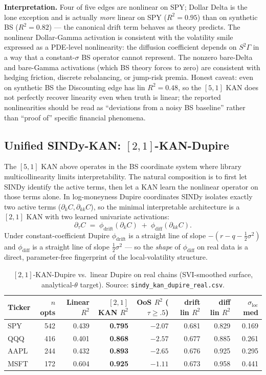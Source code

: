 \documentclass[10pt]{article}
\begin{document}
\textbf{Interpretation.} Four of five edges are nonlinear on SPY; Dollar Delta is the lone exception and is actually \emph{more} linear on SPY ($R^2{=}0.95$) than on synthetic BS ($R^2{=}0.82$) --- the canonical drift term behaves as theory predicts. The nonlinear Dollar-Gamma activation is consistent with the volatility smile expressed as a PDE-level nonlinearity: the diffusion coefficient depends on $S^2\Gamma$ in a way that a constant-$\sigma$ BS operator cannot represent. The nonzero bare-Delta and bare-Gamma activations (which BS theory forces to zero) are consistent with hedging friction, discrete rebalancing, or jump-risk premia. Honest caveat: even on synthetic BS the Discounting edge has lin $R^2{=}0.48$, so the $[5,1]$ KAN does not perfectly recover linearity even when truth is linear; the reported nonlinearities should be read as ``deviations from a noisy BS baseline'' rather than ``proof of'' specific financial phenomena.

\subsection{Unified SINDy-KAN: $[2,1]$-KAN-Dupire}\label{sec:sindy-kan}

The $[5,1]$ KAN above operates in the BS coordinate system where library multicollinearity limits interpretability. The natural composition is to first let SINDy identify the active terms, then let a KAN learn the nonlinear operator on those terms alone. In log-moneyness Dupire coordinates SINDy isolates exactly two active terms ($\partial_k C, \partial_{kk}C$), so the minimal interpretable architecture is a $[2,1]$ KAN with two learned univariate activations:
\[
\partial_\tau C \;=\; \phi_{\text{drift}}(\partial_k C) \;+\; \phi_{\text{diff}}(\partial_{kk}C).
\]
Under constant-coefficient Dupire $\phi_{\text{drift}}$ is a straight line of slope $-(r{-}q{-}\tfrac12\sigma^2)$ and $\phi_{\text{diff}}$ is a straight line of slope $\tfrac12\sigma^2$ --- so the \emph{shape} of $\phi_{\text{diff}}$ on real data is a direct, parameter-free fingerprint of the local-volatility structure.

\begin{table}[h]
\centering\footnotesize
\caption{$[2,1]$-KAN-Dupire vs.\ linear Dupire on real chains (SVI-smoothed surface, analytical-$\theta$ target). Source: \texttt{sindy\_kan\_dupire\_real.csv}.}
\label{tab:sindy-kan}
\begin{tabular}{lrrrrrrr}
\toprule
Ticker & $n$ opts & Linear $R^2$ & $[2,1]$ KAN $R^2$ & OoS $R^2$ ($\tau{\ge}.5$) & drift lin $R^2$ & diff lin $R^2$ & $\sigma_{\text{loc}}$ med \\
\midrule
SPY  & 542 & 0.439 & \textbf{0.795} & $-2.07$ & 0.681 & 0.829 & 0.169 \\
QQQ  & 416 & 0.401 & \textbf{0.868} & $-2.57$ & 0.677 & 0.885 & 0.261 \\
AAPL & 244 & 0.432 & \textbf{0.893} & $-2.65$ & 0.676 & 0.925 & 0.295 \\
MSFT & 172 & 0.604 & \textbf{0.925} & $-1.11$ & 0.673 & 0.958 & 0.441 \\
\bottomrule
\end{tabular}
\end{table}
\end{document}
